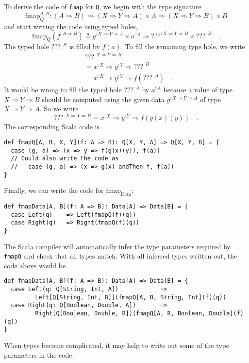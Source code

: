 To derive the code of \lstinline!fmap! for \lstinline!Q!, we begin
with the type signature
\[
\text{fmap}_{Q}^{A,B}:\left(A\Rightarrow B\right)\Rightarrow\left(X\Rightarrow Y\Rightarrow A\right)\times A\Rightarrow\left(X\Rightarrow Y\Rightarrow B\right)\times B
\]
and start writing the code using typed holes,
\[
\text{fmap}_{Q}(f^{:A\Rightarrow B})\triangleq g^{:X\Rightarrow Y\Rightarrow A}\times a^{:A}\Rightarrow\text{???}^{:X\Rightarrow Y\Rightarrow B}\times\text{???}^{:B}\quad.
\]
The typed hole $\text{???}^{:B}$ is filled by $f(a)$. To fill the
remaining type hole, we write
\begin{align*}
 & \text{???}^{:X\Rightarrow Y\Rightarrow B}\\
 & =x^{:X}\Rightarrow y^{:Y}\Rightarrow\text{???}^{:B}\\
 & =x^{:X}\Rightarrow y^{:Y}\Rightarrow f(\text{???}^{:A})\quad.
\end{align*}
It would be wrong to fill the typed hole $\text{???}^{:A}$ by $a^{:A}$
because a value of type $X\Rightarrow Y\Rightarrow B$ should be computed
using the given data $g^{:X\Rightarrow Y\Rightarrow A}$ of type $X\Rightarrow Y\Rightarrow A$.
So we write
\[
\text{???}^{:X\Rightarrow Y\Rightarrow B}=x^{:X}\Rightarrow y^{:Y}\Rightarrow f(g(x)(y))\quad.
\]
The corresponding Scala code is
\begin{lstlisting}
def fmapQ[A, B, X, Y](f: A => B): Q[X, Y, A] => Q[X, Y, B] = {
  case (g, a) => (x => y => f(g(x)(y)), f(a))
  // Could also write the code as
  //   case (g, a) => (x => g(x) andThen f, f(a))
}
\end{lstlisting}
Finally, we can write the code for $\text{fmap}_{\text{Data}}$:
\begin{lstlisting}
def fmapData[A, B](f: A => B): Data[A] => Data[B] = {
  case Left(q)    => Left(fmapQ(f)(q))
  case Right(q)   => Right(fmapQ(f)(q))
}
\end{lstlisting}
The Scala compiler will automatically infer the type parameters required
by \lstinline!fmapQ! and check that all types match. With all inferred
types written out, the code above would be
\begin{lstlisting}
def fmapData[A, B](f: A => B): Data[A] => Data[B] = {
  case Left(q: Q[String, Int, A])            =>
         Left[Q[String, Int, B]](fmapQ[A, B, String, Int](f)(q))
  case Right(q: Q[Boolean, Double, A])       =>
         Right[Q[Boolean, Double, B]](fmapQ[A, B, Boolean, Double](f)(q))
}
\end{lstlisting}
When types become complicated, it may help to write out some of the
type parameters in the code.

